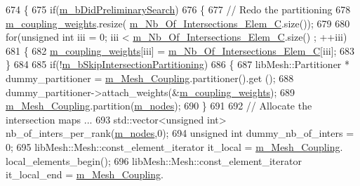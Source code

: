 \begin{DoxyCode}
674     \{
675         \textcolor{keywordflow}{if}(\hyperlink{classcarl_1_1_intersection___search_ab3d9729d5029e30fff786305c8aa3a01}{m\_bDidPreliminarySearch})
676         \{
677             \textcolor{comment}{// Redo the partitioning}
678             \hyperlink{classcarl_1_1_intersection___search_a1d44cfde49ae719c406da8bd5c463992}{m\_coupling\_weights}.resize(
      \hyperlink{classcarl_1_1_intersection___search_af54d17052502ee0d11ec33b915e2074e}{m\_Nb\_Of\_Intersections\_Elem\_C}.size());
679 
680             \textcolor{keywordflow}{for}(\textcolor{keywordtype}{unsigned} \textcolor{keywordtype}{int} iii = 0; iii < \hyperlink{classcarl_1_1_intersection___search_af54d17052502ee0d11ec33b915e2074e}{m\_Nb\_Of\_Intersections\_Elem\_C}.size()
      ; ++iii)
681             \{
682                 \hyperlink{classcarl_1_1_intersection___search_a1d44cfde49ae719c406da8bd5c463992}{m\_coupling\_weights}[iii] = 
      \hyperlink{classcarl_1_1_intersection___search_af54d17052502ee0d11ec33b915e2074e}{m\_Nb\_Of\_Intersections\_Elem\_C}[iii];
683             \}
684 
685             \textcolor{keywordflow}{if}(!\hyperlink{classcarl_1_1_intersection___search_aab4276c3ba5b247b46300de675a10cb4}{m\_bSkipIntersectionPartitioning})
686             \{
687                 libMesh::Partitioner * dummy\_partitioner = \hyperlink{classcarl_1_1_intersection___search_adb13a40afa6c1f8db7bb33f68c5b42d2}{m\_Mesh\_Coupling}.partitioner().get
      ();
688                 dummy\_partitioner->attach\_weights(&\hyperlink{classcarl_1_1_intersection___search_a1d44cfde49ae719c406da8bd5c463992}{m\_coupling\_weights});
689                 \hyperlink{classcarl_1_1_intersection___search_adb13a40afa6c1f8db7bb33f68c5b42d2}{m\_Mesh\_Coupling}.partition(\hyperlink{classcarl_1_1_intersection___search_adcfd59960cfd05bc63e9bcf5a350a8ae}{m\_nodes});
690             \}
691 
692             \textcolor{comment}{// Allocate the intersection maps ...}
693             std::vector<unsigned int> nb\_of\_inters\_per\_rank(\hyperlink{classcarl_1_1_intersection___search_adcfd59960cfd05bc63e9bcf5a350a8ae}{m\_nodes},0);
694             \textcolor{keywordtype}{unsigned} \textcolor{keywordtype}{int} dummy\_nb\_of\_inters = 0;
695             libMesh::Mesh::const\_element\_iterator it\_local = \hyperlink{classcarl_1_1_intersection___search_adb13a40afa6c1f8db7bb33f68c5b42d2}{m\_Mesh\_Coupling}.
      local\_elements\_begin();
696             libMesh::Mesh::const\_element\_iterator it\_local\_end = \hyperlink{classcarl_1_1_intersection___search_adb13a40afa6c1f8db7bb33f68c5b42d2}{m\_Mesh\_Coupling}.

\end{DoxyCode}
